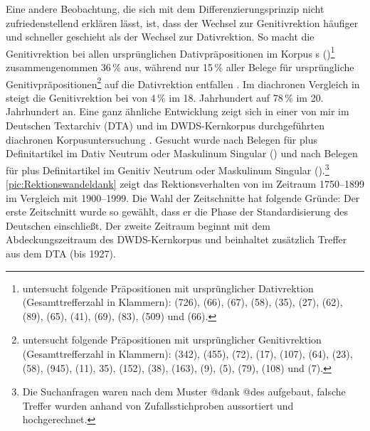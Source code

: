 Eine andere Beobachtung, die sich mit dem Differenzierungsprinzip nicht zufriedenstellend erklären lässt, ist, dass der Wechsel zur Genitivrektion häufiger und schneller geschieht als der Wechsel zur Dativrektion. 
So macht die Genitivrektion bei allen ursprünglichen Dativpräpositionen im Korpus \citeauthor{DiMeola2000}s (\citeyear{DiMeola2000})\footnote{\citet[]{DiMeola2000} untersucht folgende Präpositionen mit ursprünglicher Dativrektion (Gesamttrefferzahl in Klammern):  (726),  (66),  (67),  (58),  (35),  (27),  (62),  (89),  (65),  (41),  (69),  (83),  (509) und  (66).} zusammengenommen 36\,\% aus, während nur 15\,\% aller Belege für ursprüngliche Genitivpräpositionen\footnote{\citet[]{DiMeola2000} untersucht folgende Präpositionen mit ursprünglicher Genitivrektion (Gesamttrefferzahl in Klammern):  (342),  (455),  (72),  (17),  (107),  (64),  (23),  (58),  (945),  (11),  35),  (152),  (38),  (163),  (9),  (5),  (79),  (108) und  (7).} auf die Dativrektion entfallen \citep[s.][208--209]{DiMeola2000}. 
Im diachronen Vergleich in \citet[236]{DiMeola2000} steigt die Genitivrektion bei  von 4\,\% im 18. Jahrhundert auf 78\,\% im 20. Jahrhundert an.
Eine ganz ähnliche Entwicklung zeigt sich in einer von mir im Deutschen Textarchiv (DTA) und im DWDS-Kernkorpus durchgeführten diachronen Korpusuntersuchung \citep[s.][]{Vieregge.2019}.\largerpage
Gesucht wurde nach Belegen für  plus Definitartikel im Dativ Neutrum oder Maskulinum Singular () und nach Belegen für  plus Definitartikel im Genitiv Neutrum oder Maskulinum Singular ().\footnote{Die Suchanfragen waren nach dem Muster \glqq @dank @des\grqq{} aufgebaut, falsche Treffer wurden anhand von Zufallsstichproben aussortiert und hochgerechnet.}
\autoref{pic:Rektionswandeldank} zeigt das Rektionsverhalten von  im Zeitraum 1750--1899 im Vergleich mit 1900--1999. 
Die Wahl der Zeitschnitte hat folgende Gründe: Der erste Zeitschnitt wurde so gewählt, dass er die Phase der Standardisierung des Deutschen einschließt. 
Der zweite Zeitraum beginnt mit dem Abdeckungszeitraum des DWDS-Kernkorpus und beinhaltet zusätzlich Treffer aus dem DTA (bis 1927). 

